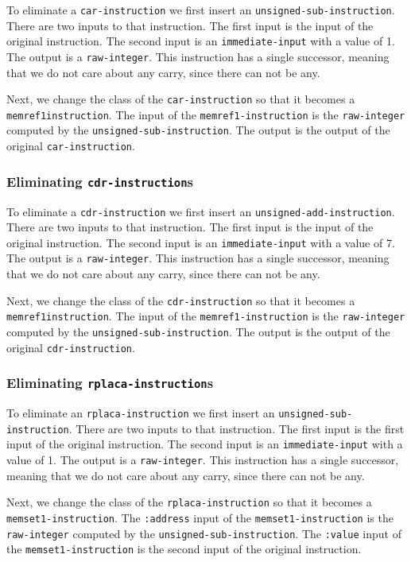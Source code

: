 To eliminate a \texttt{car-instruction} we first insert an
\texttt{unsigned-sub-instruction}.  There are two inputs to that
instruction.  The first input is the input of the original
instruction.  The second input is an \texttt{immediate-input} with a
value of 1.  The output is a \texttt{raw-integer}.  This instruction
has a single successor, meaning that we do not care about any carry,
since there can not be any.

Next, we change the class of the \texttt{car-instruction} so that it
becomes a \texttt{memref1\-instruction}.  The input of the
\texttt{memref1-instruction} is the \texttt{raw-integer} computed by
the \texttt{unsigned-sub-instruction}.  The output is the output of
the original \texttt{car-instruction}.

\subsubsection{Eliminating \texttt{cdr-instruction}s}

To eliminate a \texttt{cdr-instruction} we first insert an
\texttt{unsigned-add-instruction}.  There are two inputs to that
instruction.  The first input is the input of the original
instruction.  The second input is an \texttt{immediate-input} with a
value of 7.  The output is a \texttt{raw-integer}.  This instruction
has a single successor, meaning that we do not care about any carry,
since there can not be any.

Next, we change the class of the \texttt{cdr-instruction} so that it
becomes a \texttt{memref1\-instruction}.  The input of the
\texttt{memref1-instruction} is the \texttt{raw-integer} computed by
the \texttt{unsigned-sub-instruction}.  The output is the output of
the original \texttt{cdr-instruction}.

\subsubsection{Eliminating \texttt{rplaca-instruction}s}

To eliminate an \texttt{rplaca-instruction} we first insert an
\texttt{unsigned-sub-instruction}.  There are two inputs to that
instruction.  The first input is the first input of the original
instruction.  The second input is an \texttt{immediate-input} with a
value of 1.  The output is a \texttt{raw-integer}.  This instruction
has a single successor, meaning that we do not care about any carry,
since there can not be any.

Next, we change the class of the \texttt{rplaca-instruction} so that
it becomes a \texttt{memset1-instruction}.  The \texttt{:address}
input of the \texttt{memset1-instruction} is the \texttt{raw-integer}
computed by the \texttt{unsigned-sub-instruction}.  The
\texttt{:value} input of the \texttt{memset1-instruction} is the
second input of the original instruction.

